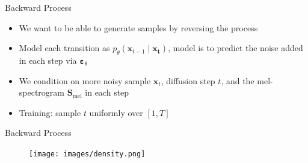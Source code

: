 \documentclass{beamer}
\begin{document}


\begin{frame}{Backward Process}

\begin{itemize}
    \setlength\itemsep{1.5em}
    \item We want to be able to generate samples by reversing the process
    \pause
    \item Model each transition as $p_{\theta}(\bm{x}_{t-1} \mid \bm{x_t})$, model is to predict the noise added in each step via $\bm{\varepsilon}_{\theta}$ %
    \pause
    \item We condition on more noisy sample $\bm{x}_t$, diffusion step $t$, and the mel-spectrogram $\bm{S}_{\text{mel}}$ in each step
    \pause
    \item Training: sample $t$ uniformly over $[1, T]$
\end{itemize}
    
\end{frame}


\begin{frame}{Backward Process}

    \begin{figure}[H]
        \centering
        \texttt{[image: images/density.png]}
    \end{figure}

\end{frame}




\end{document}
